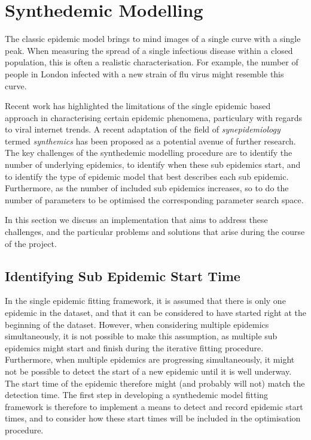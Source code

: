 \chapter{Synthedemic Modelling}
\label{ch:multi}
The classic epidemic model brings to mind images of a single curve
with a single peak. When measuring the spread of a single infectious
disease within a closed population, this is often a realistic
characterisation. For example, the number of people in London infected
with a new strain of flu virus might resemble this curve. 

Recent work has highlighted the limitations of the single epidemic
based approach in characterising certain epidemic phenomena, particulary with
regards to viral internet trends.\cite{marily2013, marily2014} A
recent adaptation of the field of \emph{synepidemiology} termed
\emph{synthemics} has been proposed as a potential avenue of further
research. The key challenges of the synthedemic modelling procedure are to
identify the number of underlying epidemics, to identify when these
sub epidemics start, and to identify the type of epidemic model that
best describes each sub epidemic. Furthermore, as the number of
included sub epidemics increases, so to do the number of parameters to
be optimised the corresponding parameter search space. 

In this section we discuss an implementation that aims to address these challenges,
and the particular problems and solutions that arise during the course
of the project.


\section{Identifying Sub Epidemic Start Time}
In the single epidemic fitting framework, it is assumed that there is
only one epidemic in the dataset, and that it can be considered to
have started right at the beginning of the dataset. However, when
considering multiple epidemics simultaneously, it is not possible to
make this assumption, as multiple sub epidemics might start and finish during
the iterative fitting procedure. Furthermore, when multiple epidemics
are progressing simultaneously, it might not be possible to detect the
start of a new epidemic until it is well underway. The start time of
the epidemic therefore might (and probably will not) match the
detection time. The first step in developing a
synthedemic model fitting framework is therefore to implement a means
to detect and record epidemic start times, and to consider how these
start times will be included in the optimisation procedure.



